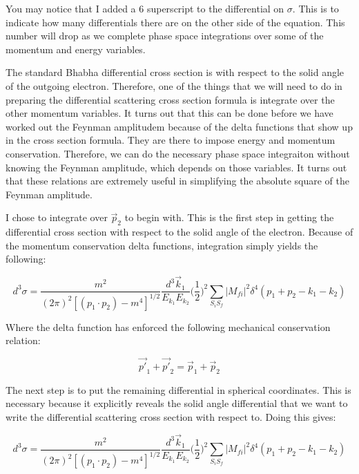 \documentclass[a4]{article}
\begin{document}
    You may notice that I added a 6 superscript to the differential on $\sigma$. This is to indicate how many differentials there are on the other side of the equation. This number will drop as we 
    complete phase space integrations over some of the momentum and energy variables.

    The standard Bhabha differential cross section is with respect to the solid angle of the outgoing electron. Therefore, one of the things that we will need to do in preparing the differential 
    scattering cross section formula is integrate over the other momentum variables. It turns out that this can be done before we have worked out the Feynman amplitudem because of the delta functions that
    show up in the cross section formula. They are there to impose energy and momentum conservation. Therefore, we can do the necessary phase space integraiton without knowing the Feynman amplitude, which
    depends on those variables. It turns out that these relations are extremely useful in simplifying the absolute square of the Feynman amplitude.

    I chose to integrate over $\vec{p}_2$ to begin with. This is the first step in getting the differential cross section with respect to the solid angle of the electron. Because of the momentum conservation
    delta functions, integration simply yields the following:

    \begin{equation}
        d^3 \sigma = \frac{m^2}{(2 \pi)^2 [(p_1 \cdot p_2) - m^4]^{1/2}} \frac{d^3 \vec{k}_1}{E_{k_1} E_{k_2}} \bigg( \frac{1}{2} \bigg)^2 \sum_{S_i S_f} |M_{fi}|^2 \delta^4 (p_1 + p_2 - k_1 - k_2)
    \end{equation}

    Where the delta function has enforced the following mechanical conservation relation:

    \[
        \vec{p'}_1 + \vec{p'}_2 = \vec{p}_1 + \vec{p}_2
    \]

    The next step is to put the remaining differential in spherical coordinates. This is necessary because it explicitly reveals the solid angle differential that we want to write the differential scattering
    cross section with respect to. Doing this gives:

    \begin{equation}
        d^3 \sigma = \frac{m^2}{(2 \pi)^2 [(p_1 \cdot p_2) - m^4]^{1/2}} \frac{d^3 \vec{k}_1}{E_{k_1} E_{k_2}} \bigg( \frac{1}{2} \bigg)^2 \sum_{S_i S_f} |M_{fi}|^2 \delta^4 (p_1 + p_2 - k_1 - k_2)
    \end{equation}
\end{document}
